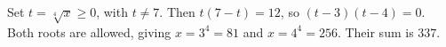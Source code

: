 Set $t=\sqrt[4]x\ge0$, with $t\ne7$. Then $t(7-t)=12$, so $(t-3)(t-4)=0$. Both roots are allowed, giving $x=3^4=81$ and $x=4^4=256$. Their sum is $\boxed{337}$.
